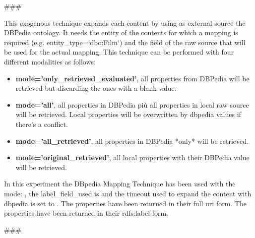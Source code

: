 
\usepackage{comment}


###

This exogenous technique expands each content by using as external source the DBPedia ontology.
It needs the entity of the contents for which a mapping is required (e.g. entity\_type=`dbo:Film`)
and the field of the raw source that will be used for the actual mapping.
This technique can be performed with four different modalities as follows:
\begin{itemize}
 \item
       \textbf{mode='only\_retrieved\_evaluated'}, all properties from DBPedia will be retrieved but discarding the
        ones with a blank value.
 \item
       \textbf{mode='all'}, all properties in DBPedia più all properties in local raw source will be retrieved.
        Local properties will be overwritten by dbpedia values if there's a conflict.
 \item
       \textbf{mode='all\_retrieved'}, all properties in DBPedia *only* will be retrieved.
 \item
       \textbf{mode='original\_retrieved'}, all local properties with their DBPedia value will be retrieved.
\end{itemize}
\hfill\break
\hfill\break
In this experiment the DBpedia Mapping Technique has been used with the mode:
, the label_field_used is
 and the timeout used
to expand the content with dbpedia is set to
.
The properties have been returned in their full uri form.
The properties have been returned in their rdfs:label form.
\hfill\break
\hfill\break


###



\begin{comment}
Author = DIEGO MICCOLI
Alias = Kozen88
Organization = SWAP Research Group UniBa
Date = 27-12-2023

This mini template is not working by itself because there are latex command missing needed
to compile the file and give as output a pdf file, in addition it has been added jinja
statement in order to control the rendering of the latex file with the jinja library, for these
reasons it needs to be used with the other mini chunks in conjunction.
\end{comment}
